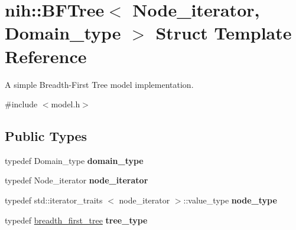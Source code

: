 \hypertarget{structnih_1_1_b_f_tree}{
\section{nih\-:\-:\-B\-F\-Tree$<$ \-Node\-\_\-iterator, \-Domain\-\_\-type $>$ \-Struct \-Template \-Reference}
\label{structnih_1_1_b_f_tree}
}


\-A simple \-Breadth-\/\-First \-Tree model implementation.  




{\ttfamily \#include $<$model.\-h$>$}

\subsection*{\-Public \-Types}
\begin{DoxyCompactItemize}
\item 
\hypertarget{structnih_1_1_b_f_tree_a49a71f0c9b5adbb2d0ecd7512cc5920c}{
typedef \-Domain\-\_\-type {\bfseries domain\-\_\-type}}
\label{structnih_1_1_b_f_tree_a49a71f0c9b5adbb2d0ecd7512cc5920c}

\item 
\hypertarget{structnih_1_1_b_f_tree_a0f627e9a846cc35b939b421b45f279d2}{
typedef \-Node\-\_\-iterator {\bfseries node\-\_\-iterator}}
\label{structnih_1_1_b_f_tree_a0f627e9a846cc35b939b421b45f279d2}

\item 
\hypertarget{structnih_1_1_b_f_tree_af59970d8c46be0390ce28e37acff3c85}{
typedef std\-::iterator\-\_\-traits\*
$<$ node\-\_\-iterator $>$\-::value\-\_\-type {\bfseries node\-\_\-type}}
\label{structnih_1_1_b_f_tree_af59970d8c46be0390ce28e37acff3c85}

\item 
\hypertarget{structnih_1_1_b_f_tree_ab98a2162885f15d504cfa262b47bc771}{
typedef \hyperlink{structnih_1_1breadth__first__tree}{breadth\-\_\-first\-\_\-tree} {\bfseries tree\-\_\-type}}
\label{structnih_1_1_b_f_tree_ab98a2162885f15d504cfa262b47bc771}

\end{DoxyCompactItemize}
